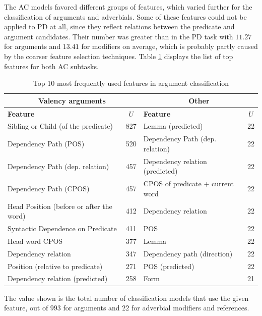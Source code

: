 \documentclass[12pt,notitlepage]{report}
\begin{document}
The AC models favored different groups of features, which varied further for the classification of arguments and adverbials. Some of these features could not be applied to PD at all, since they reflect relations between the predicate and argument candidates. Their number was greater than in the PD task with $11.27$ for arguments and $13.41$ for modifiers on average, which is probably partly caused by the coarser feature selection techniques. Table \ref{tab:feats-ac} displays the list of top features for both AC subtasks.

\begin{table}[htb]\footnotesize
\caption{Top 10 most frequently used features in argument classification}\label{tab:feats-ac}
\begin{center}
\begin{tabular}{|l|c||l|c|}\hline
\multicolumn{2}{|c||}{\bf Valency arguments} & \multicolumn{2}{c|}{\bf Other} \\\hline
\bf Feature & $U$ & \bf Feature & $U$ \\\hline
Sibling or Child (of the predicate) & 827 & Lemma (predicted) & 22 \\
Dependency Path (POS) & 520 & Dependency Path (dep. relation) & 22 \\
Dependency Path (dep. relation)  & 457 & Dependency relation (predicted) & 22 \\
Dependency Path (CPOS) & 457 & CPOS of predicate + current word & 22 \\
Head Position (before or after the word) & 412 & Dependency relation & 22 \\
Syntactic Dependence on Predicate & 411 & POS & 22 \\
Head word CPOS & 377 & Lemma & 22 \\
Dependency relation & 347 & Dependency path (direction) & 22 \\
Position (relative to predicate) & 271 & POS (predicted) & 22 \\
Dependency relation (predicted) & 258 & Form & 21 \\\hline
\end{tabular}
\end{center}
The value shown is the total number of classification models that use the given feature, out of $993$ for arguments and $22$ for adverbial modifiers and references.
\end{table}
\end{document}
